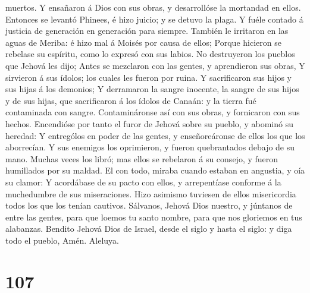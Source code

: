 muertos.  Y ensañaron á Dios con sus obras, y
desarrollóse la mortandad en ellos.  Entonces se levantó
Phinees, é hizo juicio; y se detuvo la plaga.  Y fuéle
contado á justicia de generación en generación para siempre.
 También le irritaron en las aguas de Meriba: é hizo mal
á Moisés por causa de ellos;  Porque hicieron se rebelase
su espíritu, como lo expresó con sus labios.  No
destruyeron los pueblos que Jehová les dijo;  Antes se
mezclaron con las gentes, y aprendieron sus obras,  Y
sirvieron á sus ídolos; los cuales les fueron por ruina. 
Y sacrificaron sus hijos y sus hijas á los demonios;  Y
derramaron la sangre inocente, la sangre de sus hijos y de sus hijas,
que sacrificaron á los ídolos de Canaán: y la tierra fué contaminada con
sangre.  Contamináronse así con sus obras, y fornicaron
con sus hechos.  Encendióse por tanto el furor de Jehová
sobre su pueblo, y abominó su heredad:  Y entrególos en
poder de las gentes, y enseñoreáronse de ellos los que los aborrecían.
 Y sus enemigos los oprimieron, y fueron quebrantados
debajo de su mano.  Muchas veces los libró; mas ellos se
rebelaron á su consejo, y fueron humillados por su maldad.
 El con todo, miraba cuando estaban en angustia, y oía su
clamor:  Y acordábase de su pacto con ellos, y
arrepentíase conforme á la muchedumbre de sus miseraciones.
 Hizo asimismo tuviesen de ellos misericordia todos los
que los tenían cautivos.  Sálvanos, Jehová Dios nuestro,
y júntanos de entre las gentes, para que loemos tu santo nombre, para
que nos gloriemos en tus alabanzas.  Bendito Jehová Dios
de Israel, desde el siglo y hasta el siglo: y diga todo el pueblo, Amén.
Aleluya.

\hypertarget{section-106}{%
\section{107}\label{section-106}}

